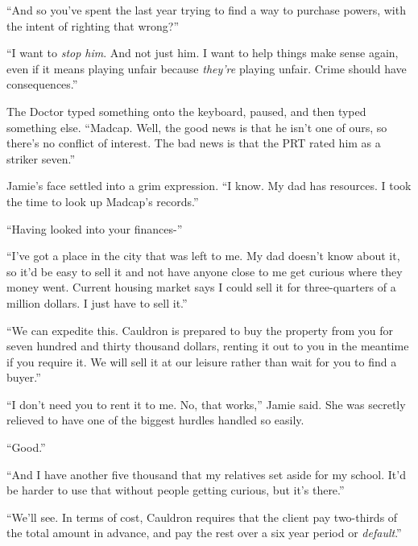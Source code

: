 ``And so you've spent the last year trying to find a way to purchase powers, with the intent of righting that wrong?''



``I want to \emph{stop him}.  And not just him.  I want to help things make sense again, even if it means playing unfair because \emph{they're }playing unfair.  Crime should have consequences.''



The Doctor typed something onto the keyboard, paused, and then typed something else. ``Madcap.  Well, the good news is that he isn't one of ours, so there's no conflict of interest. The bad news is that the PRT rated him as a striker seven.''



Jamie's face settled into a grim expression.  ``I know.  My dad has resources.  I took the time to look up Madcap's records.''



``Having looked into your finances-''



``I've got a place in the city that was left to me.  My dad doesn't know about it, so it'd be easy to sell it and not have anyone close to me get curious where they money went.  Current housing market says I could sell it for three-quarters of a million dollars.  I just have to sell it.''



``We can expedite this.  Cauldron is prepared to buy the property from you for seven hundred and thirty thousand dollars, renting it out to you in the meantime if you require it.  We will sell it at our leisure rather than wait for you to find a buyer.''



``I don't need you to rent it to me.  No, that works,'' Jamie said.  She was secretly relieved to have one of the biggest hurdles handled so easily.



``Good.''



``And I have another five thousand that my relatives set aside for my school.  It'd be harder to use that without people getting curious, but it's there.''



``We'll see.  In terms of cost, Cauldron requires that the client pay two-thirds of the total amount in advance, and pay the rest over a six year period or \emph{default}.''



